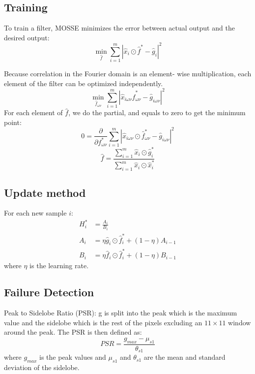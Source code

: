 \documentclass[12pt]{article}
\numberwithin{equation}{section}
\begin{document}
\subsection{Training}
To train a filter, MOSSE minimizes the error between actual output and the desired output:
\begin{equation} \label{eq:mossetarget}
	\min_{\hat{f}} \sum_{i=1}^{m} |\hat{x}_i \odot \hat{f}^* - \hat{g}_i|^2
\end{equation} \par
Because correlation in the Fourier domain is an element- wise multiplication, each element of the filter can be optimized independently.
\begin{equation}
	\min_{\hat{f}_{\omega \nu}}\sum_{i=1}^{m}|\hat{x}_{i\omega \nu}  \hat{f}^*_{\omega \nu} - \hat{g}_{i\omega \nu}|^2
\end{equation} 
For each element of $\hat{f}$, we do the partial, and equals to zero to get the minimum point:
\begin{equation}
	0= \frac{\partial}{\partial f^*_{\omega \nu}}\sum_{i=1}^{m}|\hat{x}_{i\omega \nu} \odot \hat{f}^*_{\omega \nu} - \hat{g}_{i\omega \nu}|^2
\end{equation} 
\begin{equation}
	\hat{f}= \frac{\sum_{i=1}^{m}\hat{x}_i \odot \hat{g}^*_i }{\sum_{i=1}^{m}\hat{x}_i \odot \hat{x}^*_i}
\end{equation} 
\subsection{Update method}
For each new sample $i$:
\begin{align}
	H^*_i &= \frac{A_i}{B_i} \\
	A_i &= \eta \hat{g}_i \odot \hat{f}_i^* + (1-\eta)A_{i-1} \\
	B_i &= \eta\hat{f}_i\odot \hat{f}_i^* + (1-\eta)B_{i-1}
\end{align}
where $\eta$ is the learning rate.

\subsection{Failure Detection}
Peak to Sidelobe Ratio (PSR): g is split into the peak which is the maximum value and the sidelobe which
is the rest of the pixels excluding an $11 \times 11$ window around the peak. The PSR is then defined as:
\begin{equation}
	PSR = \frac{g_{max}-\mu_{s1}}{\theta_{s1}}
\end{equation}
where $g_{max}$ is the peak values and $\mu_{s1}$ and $\theta_{s1}$ are the mean and standard deviation of the sidelobe. \par
\end{document}
